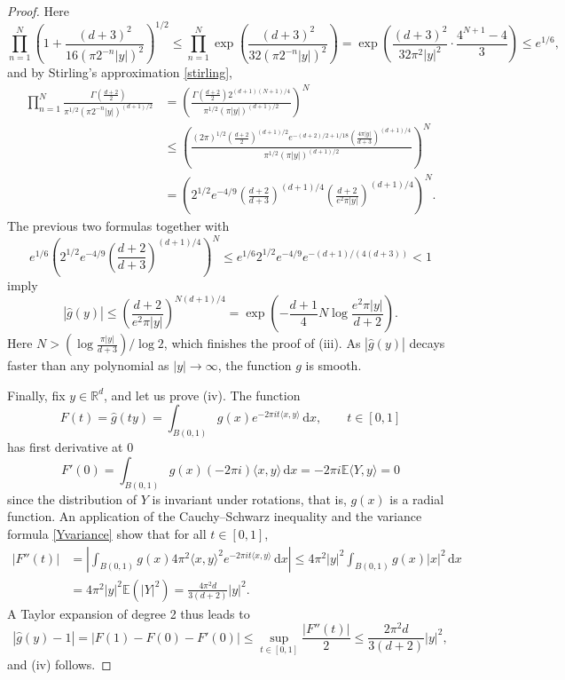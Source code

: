 \documentclass[11pt,a4paper]{article}
\theoremstyle{definition}
\begin{document}
\begin{proof}
Here
\[ \prod_{n=1}^N \left(1+\frac{(d+3)^2}{16 (\pi 2^{-n}|y|)^2} \right)^{1/2} \le \prod_{n=1}^N \exp \left( \frac{(d+3)^2}{32 (\pi 2^{-n}|y|)^2} \right) = \exp \left( \frac{(d+3)^2}{32 \pi^2 |y|^2} \cdot \frac{4^{N+1}-4}{3} \right) \le e^{1/6} , \]
and by Stirling's approximation \eqref{stirling},
\[ \begin{split} \prod_{n=1}^N \frac{\Gamma \left( \frac{d+2}{2} \right)}{\pi^{1/2} \left( \pi 2^{-n} |y| \right)^{(d+1)/2}} &= \left( \frac{\Gamma \left( \frac{d+2}{2} \right) 2^{(d+1)(N+1)/4}}{\pi^{1/2} (\pi |y|)^{(d+1)/2}} \right)^N \\ &\le \left( \frac{(2 \pi)^{1/2} \left( \frac{d+2}{2} \right)^{(d+1)/2} e^{-(d+2)/2 + 1/18}\left( \frac{4 \pi |y|}{d+3} \right)^{(d+1)/4}}{\pi^{1/2} (\pi |y|)^{(d+1)/2}} \right)^N \\ &= \left( 2^{1/2} e^{-4/9} \left( \frac{d+2}{d+3} \right)^{(d+1)/4} \left( \frac{d+2}{e^2 \pi |y|} \right)^{(d+1)/4} \right)^N . \end{split} \]
The previous two formulas together with
\[ e^{1/6} \left( 2^{1/2} e^{-4/9} \left( \frac{d+2}{d+3} \right)^{(d+1)/4} \right)^N \le e^{1/6} 2^{1/2} e^{-4/9} e^{-(d+1)/(4(d+3))} < 1 \]
imply
\[ |\widehat{g}(y)| \le \left( \frac{d+2}{e^2 \pi |y|} \right) ^{N(d+1)/4} = \exp \left( - \frac{d+1}{4} N \log \frac{e^2 \pi |y|}{d+2} \right) . \]
Here $N> (\log \frac{\pi |y|}{d+3} )/\log 2$, which finishes the proof of (iii). As $|\widehat{g}(y)|$ decays faster than any polynomial as $|y| \to \infty$, the function $g$ is smooth.

Finally, fix $y \in \mathbb{R}^d$, and let us prove (iv). The function
\[ F(t)=\widehat{g}(ty) = \int_{B(0,1)} g(x) e^{-2 \pi i t \langle x,y \rangle} \, \mathrm{d}x, \qquad t \in [0,1] \]
has first derivative at $0$
\[ F'(0) = \int_{B(0,1)} g(x) (- 2 \pi i) \langle x, y \rangle \, \mathrm{d}x = - 2 \pi i \mathbb{E} \langle Y, y \rangle = 0 \]
since the distribution of $Y$ is invariant under rotations, that is, $g(x)$ is a radial function. An application of the Cauchy--Schwarz inequality and the variance formula \eqref{Yvariance} show that for all $t \in [0,1]$,
\[ \begin{split} |F''(t)| &= \left| \int_{B(0,1)} g(x) 4 \pi^2 \langle x,y \rangle^2 e^{-2 \pi i t \langle x, y \rangle} \, \mathrm{d}x \right| \le 4 \pi^2 |y|^2 \int_{B(0,1)} g(x) |x|^2 \, \mathrm{d}x \\ &= 4 \pi^2 |y|^2 \mathbb{E} (|Y|^2) = \frac{4 \pi^2 d}{3(d+2)} |y|^2 . \end{split} \]
A Taylor expansion of degree 2 thus leads to
\[ |\widehat{g}(y)-1| = |F(1) - F(0) - F'(0)| \le \sup_{t \in [0,1]} \frac{|F''(t)|}{2} \le \frac{2 \pi^2 d}{3(d+2)} |y|^2 , \]
and (iv) follows.
\end{proof}
\end{document}
